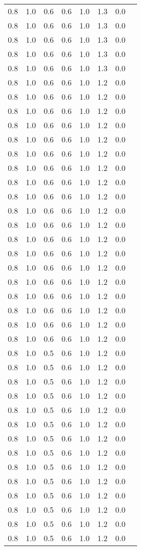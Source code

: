 \begin{tabular}{L{1in}|L{1in}|L{1in}|L{1in}|L{1in}|L{1in}|L{1in}|L{1in}}
0.8&1.0&0.6&0.6&1.0&1.3&0.0\\
0.8&1.0&0.6&0.6&1.0&1.3&0.0\\
0.8&1.0&0.6&0.6&1.0&1.3&0.0\\
0.8&1.0&0.6&0.6&1.0&1.3&0.0\\
0.8&1.0&0.6&0.6&1.0&1.3&0.0\\
0.8&1.0&0.6&0.6&1.0&1.2&0.0\\
0.8&1.0&0.6&0.6&1.0&1.2&0.0\\
0.8&1.0&0.6&0.6&1.0&1.2&0.0\\
0.8&1.0&0.6&0.6&1.0&1.2&0.0\\
0.8&1.0&0.6&0.6&1.0&1.2&0.0\\
0.8&1.0&0.6&0.6&1.0&1.2&0.0\\
0.8&1.0&0.6&0.6&1.0&1.2&0.0\\
0.8&1.0&0.6&0.6&1.0&1.2&0.0\\
0.8&1.0&0.6&0.6&1.0&1.2&0.0\\
0.8&1.0&0.6&0.6&1.0&1.2&0.0\\
0.8&1.0&0.6&0.6&1.0&1.2&0.0\\
0.8&1.0&0.6&0.6&1.0&1.2&0.0\\
0.8&1.0&0.6&0.6&1.0&1.2&0.0\\
0.8&1.0&0.6&0.6&1.0&1.2&0.0\\
0.8&1.0&0.6&0.6&1.0&1.2&0.0\\
0.8&1.0&0.6&0.6&1.0&1.2&0.0\\
0.8&1.0&0.6&0.6&1.0&1.2&0.0\\
0.8&1.0&0.6&0.6&1.0&1.2&0.0\\
0.8&1.0&0.6&0.6&1.0&1.2&0.0\\
0.8&1.0&0.5&0.6&1.0&1.2&0.0\\
0.8&1.0&0.5&0.6&1.0&1.2&0.0\\
0.8&1.0&0.5&0.6&1.0&1.2&0.0\\
0.8&1.0&0.5&0.6&1.0&1.2&0.0\\
0.8&1.0&0.5&0.6&1.0&1.2&0.0\\
0.8&1.0&0.5&0.6&1.0&1.2&0.0\\
0.8&1.0&0.5&0.6&1.0&1.2&0.0\\
0.8&1.0&0.5&0.6&1.0&1.2&0.0\\
0.8&1.0&0.5&0.6&1.0&1.2&0.0\\
0.8&1.0&0.5&0.6&1.0&1.2&0.0\\
0.8&1.0&0.5&0.6&1.0&1.2&0.0\\
0.8&1.0&0.5&0.6&1.0&1.2&0.0\\
0.8&1.0&0.5&0.6&1.0&1.2&0.0\\
0.8&1.0&0.5&0.6&1.0&1.2&0.0\\

\end{tabular}
